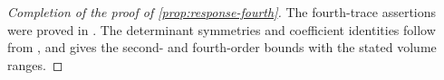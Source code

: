 \documentclass[11pt,letterpaper,reqno]{amsart}
\begin{document}
\begin{proof}[Completion of the proof of \cref{prop:response-fourth}]
The fourth-trace assertions were proved in
.
The determinant symmetries and coefficient identities follow from
, and
 gives the second- and
fourth-order bounds with the stated volume ranges.
\end{proof}

\printbibliography
\end{document}

